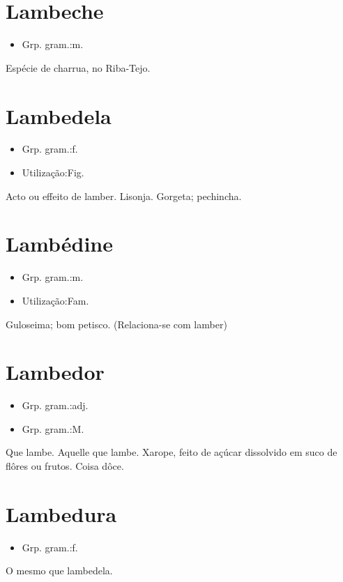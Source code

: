 \section{Lambeche}
\begin{itemize}
\item {Grp. gram.:m.}
\end{itemize}
Espécie de charrua, no Riba-Tejo.
\section{Lambedela}
\begin{itemize}
\item {Grp. gram.:f.}
\end{itemize}
\begin{itemize}
\item {Utilização:Fig.}
\end{itemize}
Acto ou effeito de lamber.
Lisonja.
Gorgeta; pechincha.
\section{Lambédine}
\begin{itemize}
\item {Grp. gram.:m.}
\end{itemize}
\begin{itemize}
\item {Utilização:Fam.}
\end{itemize}
Guloseima; bom petisco.
(Relaciona-se com \textunderscore lamber\textunderscore )
\section{Lambedor}
\begin{itemize}
\item {Grp. gram.:adj.}
\end{itemize}
\begin{itemize}
\item {Grp. gram.:M.}
\end{itemize}
Que lambe.
Aquelle que lambe.
Xarope, feito de açúcar dissolvido em suco de flôres ou frutos.
Coisa dôce.
\section{Lambedura}
\begin{itemize}
\item {Grp. gram.:f.}
\end{itemize}
O mesmo que \textunderscore lambedela\textunderscore .
